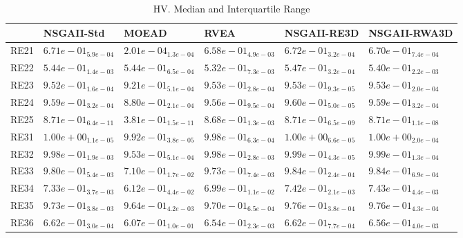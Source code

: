 \documentclass{article}
\begin{document}
\begin{table}
\caption{HV. Median and Interquartile Range}
\label{table: HV}
\centering
\begin{scriptsize}
\begin{tabular}{llllll}
\hline & NSGAII-Std & MOEAD & RVEA & NSGAII-RE3D &  NSGAII-RWA3D\\
\hline 
RE21 & \cellcolor{gray25}$  6.71e-01_{ 5.9e-04}$ & $  2.01e-04_{ 1.3e-04}$ & $  6.58e-01_{ 4.9e-03}$ & \cellcolor{gray95}$  6.72e-01_{ 3.2e-04}$ & $  6.70e-01_{ 7.4e-04}$ \\
RE22 & $  5.44e-01_{ 1.4e-03}$ & \cellcolor{gray25}$  5.44e-01_{ 6.5e-04}$ & $  5.32e-01_{ 7.3e-03}$ & \cellcolor{gray95}$  5.47e-01_{ 3.2e-04}$ & $  5.40e-01_{ 2.2e-03}$ \\
RE23 & $  9.52e-01_{ 1.6e-04}$ & $  9.21e-01_{ 5.1e-04}$ & \cellcolor{gray95}$  9.53e-01_{ 2.8e-04}$ & \cellcolor{gray25}$  9.53e-01_{ 9.3e-05}$ & $  9.53e-01_{ 2.0e-04}$ \\
RE24 & $  9.59e-01_{ 3.2e-04}$ & $  8.80e-01_{ 2.1e-04}$ & $  9.56e-01_{ 9.5e-04}$ & \cellcolor{gray95}$  9.60e-01_{ 5.0e-05}$ & \cellcolor{gray25}$  9.59e-01_{ 3.2e-04}$ \\
RE25 & \cellcolor{gray95}$  8.71e-01_{ 6.4e-11}$ & $  3.81e-01_{ 1.5e-11}$ & $  8.68e-01_{ 1.3e-03}$ & $  8.71e-01_{ 6.5e-09}$ & \cellcolor{gray25}$  8.71e-01_{ 1.1e-08}$ \\
RE31 & \cellcolor{gray95}$  1.00e+00_{ 1.1e-05}$ & $  9.92e-01_{ 3.8e-05}$ & $  9.98e-01_{ 6.3e-04}$ & $  1.00e+00_{ 6.6e-05}$ & \cellcolor{gray25}$  1.00e+00_{ 2.0e-04}$ \\
RE32 & $  9.98e-01_{ 1.9e-03}$ & $  9.53e-01_{ 5.1e-04}$ & $  9.98e-01_{ 2.8e-03}$ & \cellcolor{gray95}$  9.99e-01_{ 4.3e-05}$ & \cellcolor{gray25}$  9.99e-01_{ 1.3e-04}$ \\
RE33 & $  9.80e-01_{ 5.4e-03}$ & $  7.10e-01_{ 1.7e-02}$ & $  9.73e-01_{ 7.4e-03}$ & \cellcolor{gray95}$  9.84e-01_{ 2.4e-04}$ & \cellcolor{gray25}$  9.84e-01_{ 6.9e-04}$ \\
RE34 & $  7.33e-01_{ 3.7e-03}$ & $  6.12e-01_{ 4.4e-02}$ & $  6.99e-01_{ 1.1e-02}$ & \cellcolor{gray25}$  7.42e-01_{ 2.1e-03}$ & \cellcolor{gray95}$  7.43e-01_{ 4.4e-03}$ \\
RE35 & $  9.73e-01_{ 3.8e-03}$ & $  9.64e-01_{ 4.2e-03}$ & $  9.70e-01_{ 6.5e-04}$ & \cellcolor{gray95}$  9.76e-01_{ 3.8e-04}$ & \cellcolor{gray25}$  9.76e-01_{ 4.3e-04}$ \\
RE36 & \cellcolor{gray95}$  6.62e-01_{ 3.0e-04}$ & $  6.07e-01_{ 1.0e-01}$ & $  6.54e-01_{ 2.3e-03}$ & \cellcolor{gray25}$  6.62e-01_{ 7.7e-04}$ & $  6.56e-01_{ 4.0e-03}$ \\

\end{tabular}
\end{scriptsize}
\end{table}
\end{document}
